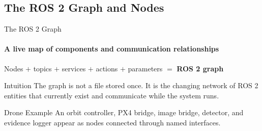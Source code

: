 \subsection{The ROS 2 Graph and Nodes}

\begin{frame}{The ROS 2 Graph}
\framesubtitle{A live map of components and communication relationships}
\begin{center}
Nodes $+$ topics $+$ services $+$ actions $+$ parameters $=$ \textbf{ROS 2 graph}
\end{center}
\begin{block}{Intuition}
The graph is not a file stored once. It is the changing network of ROS 2 entities that currently exist and communicate while the system runs.
\end{block}
\begin{exampleblock}{Drone Example}
An orbit controller, PX4 bridge, image bridge, detector, and evidence logger appear as nodes connected through named interfaces.
\end{exampleblock}
\end{frame}





